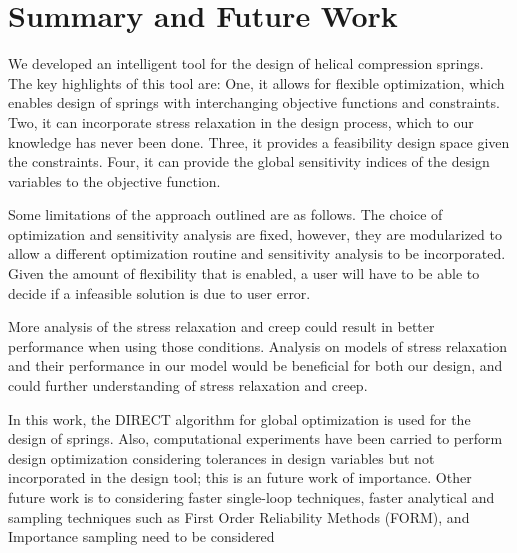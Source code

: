 \documentclass[10pt]{article}
\begin{document}
%
%

\section{Summary and Future Work}
\label{sec:Summary}
We developed an intelligent tool for the design of helical compression springs. The key highlights of this tool are: One, it allows for flexible optimization, which enables design of springs with interchanging objective functions and constraints. Two, it can incorporate stress relaxation in the design process, which to our knowledge has never been done. Three, it provides a feasibility design space given the constraints. Four, it can provide the global sensitivity indices of the design variables to the objective function. 

Some limitations of the approach outlined are as follows. The choice of optimization and sensitivity analysis are fixed, however, they are modularized to allow a different optimization routine and sensitivity analysis to be incorporated. Given the amount of flexibility that is enabled, a user will have to be able to decide if a infeasible solution is due to user error. 

More analysis of the stress relaxation and creep could result in better performance when using those conditions. Analysis on models of stress relaxation and their performance in our model would be beneficial for both our design, and could further understanding of stress relaxation and creep.

In this work, the DIRECT algorithm for global optimization is used for the design of springs. Also, computational experiments have been carried to perform design optimization considering tolerances in design variables but not incorporated in the design tool; this is an future work of importance. Other future work is to considering faster single-loop techniques, faster analytical and sampling techniques such as First Order Reliability Methods (FORM), and Importance sampling need to be considered
\end{document}
